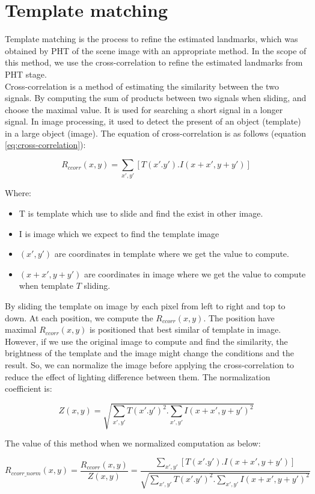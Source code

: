 \section{Template matching}
Template matching is the process to refine the estimated landmarks, which was obtained by PHT of the scene image with an appropriate method. In the scope of this method, we use the cross-correlation to refine the estimated landmarks from PHT stage.\\[0.2cm]
Cross-correlation is a method of estimating the similarity between the two signals. By computing the sum of products between two signals when sliding, and choose the maximal value. It is used for searching a short signal in a longer signal. In image processing, it used to detect the present of an object (template) in a large object (image). The equation of cross-correlation is as follows (equation \ref{eq:cross-correlation}):
\begin{center}
\begin{equation}\label{eq:cross-correlation}
R_{ccorr}(x,y) = \sum\limits_{x',y'}[T(x'.y').I(x + x', y + y')]
\end{equation}
\end{center}
Where:
\begin{itemize}
\item T is template which use to slide and find the exist in other image.
\item I is image which we expect to find the template image
\item $(x', y')$ are coordinates in template where we get the value to compute.
\item $(x + x', y + y')$ are coordinates in image where we get the value to compute when template $T$ sliding.
\end{itemize}
By sliding the template on image by each pixel from left to right and top to down. At each position, we compute the $R_{ccorr}(x,y)$. The position have maximal $R_{ccorr}(x,y)$ is positioned that best similar of template in image.\\[0.2cm]
However, if we use the original image to compute and find the similarity, the brightness of the template and the image might change the conditions and the result. So, we can normalize the image before applying the cross-correlation to reduce the effect of lighting difference between them. The normalization coefficient is:
\begin{center}
\begin{equation}\label{eq:normalizeCoff}
Z(x,y) = \sqrt{\sum\limits_{x',y'}T(x'.y')^{2}.\sum\limits_{x',y'}I(x + x', y + y')^{2}}
\end{equation}
\end{center}
The value of this method when we normalized computation as below:
\begin{center}
\begin{equation}\label{eq:cross-correlation}
R_{ccorr\_norm}(x,y) =\frac{R_{ccorr}(x,y)}{Z(x,y)} = \frac{\sum\limits_{x',y'}[T(x'.y').I(x + x', y + y')]}{\sqrt{\sum\limits_{x',y'}T(x'.y')^{2}.\sum\limits_{x',y'}I(x + x', y + y')^{2}}}
\end{equation}
\end{center}
